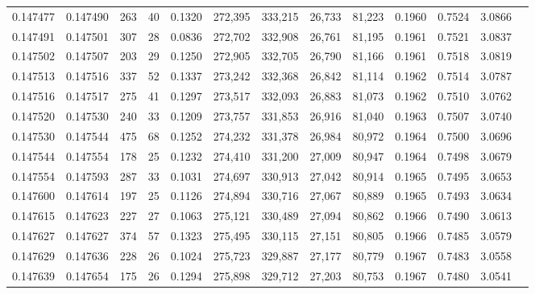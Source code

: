 \begin{tabular}{rrrrrrrrrrrrr}
0.147477 & 0.147490 &   263 &  40 &                                     0.1320 & 272,395 & 333,215 &  26,733 &  81,223 & 0.1960 & 0.7524 & 3.0866 \\
0.147491 & 0.147501 &   307 &  28 &                                     0.0836 & 272,702 & 332,908 &  26,761 &  81,195 & 0.1961 & 0.7521 & 3.0837 \\
0.147502 & 0.147507 &   203 &  29 &                                     0.1250 & 272,905 & 332,705 &  26,790 &  81,166 & 0.1961 & 0.7518 & 3.0819 \\
0.147513 & 0.147516 &   337 &  52 &                                     0.1337 & 273,242 & 332,368 &  26,842 &  81,114 & 0.1962 & 0.7514 & 3.0787 \\
0.147516 & 0.147517 &   275 &  41 &                                     0.1297 & 273,517 & 332,093 &  26,883 &  81,073 & 0.1962 & 0.7510 & 3.0762 \\
0.147520 & 0.147530 &   240 &  33 &                                     0.1209 & 273,757 & 331,853 &  26,916 &  81,040 & 0.1963 & 0.7507 & 3.0740 \\
0.147530 & 0.147544 &   475 &  68 &                                     0.1252 & 274,232 & 331,378 &  26,984 &  80,972 & 0.1964 & 0.7500 & 3.0696 \\
0.147544 & 0.147554 &   178 &  25 &                                     0.1232 & 274,410 & 331,200 &  27,009 &  80,947 & 0.1964 & 0.7498 & 3.0679 \\
0.147554 & 0.147593 &   287 &  33 &                                     0.1031 & 274,697 & 330,913 &  27,042 &  80,914 & 0.1965 & 0.7495 & 3.0653 \\
0.147600 & 0.147614 &   197 &  25 &                                     0.1126 & 274,894 & 330,716 &  27,067 &  80,889 & 0.1965 & 0.7493 & 3.0634 \\
0.147615 & 0.147623 &   227 &  27 &                                     0.1063 & 275,121 & 330,489 &  27,094 &  80,862 & 0.1966 & 0.7490 & 3.0613 \\
0.147627 & 0.147627 &   374 &  57 &                                     0.1323 & 275,495 & 330,115 &  27,151 &  80,805 & 0.1966 & 0.7485 & 3.0579 \\
0.147629 & 0.147636 &   228 &  26 &                                     0.1024 & 275,723 & 329,887 &  27,177 &  80,779 & 0.1967 & 0.7483 & 3.0558 \\
0.147639 & 0.147654 &   175 &  26 &                                     0.1294 & 275,898 & 329,712 &  27,203 &  80,753 & 0.1967 & 0.7480 & 3.0541 \\

\end{tabular}
